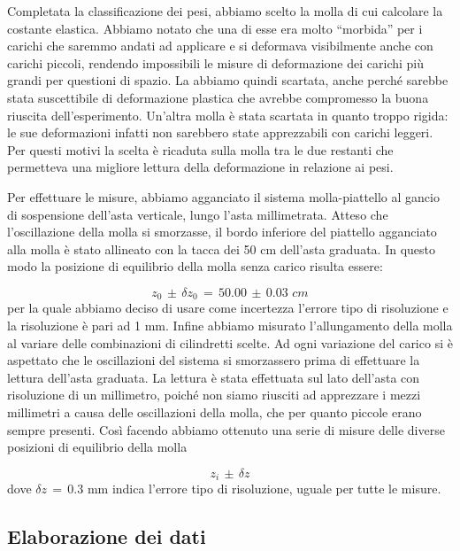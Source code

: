 Completata la classificazione dei pesi, abbiamo scelto la molla di cui calcolare la
costante elastica. Abbiamo notato che una di esse era molto ``morbida'' per i carichi che saremmo
andati ad applicare e si deformava visibilmente anche con carichi piccoli, rendendo impossibili
le misure di deformazione dei carichi più grandi per questioni di spazio.
La abbiamo quindi scartata, anche perché sarebbe stata suscettibile di deformazione
plastica che avrebbe compromesso la buona riuscita dell'esperimento.
Un'altra molla è stata scartata in quanto troppo rigida: le sue deformazioni infatti non sarebbero state apprezzabili con carichi leggeri. Per questi motivi la scelta è ricaduta sulla molla tra 
le due restanti che permetteva una migliore lettura della deformazione in relazione ai pesi.

Per effettuare le misure, abbiamo agganciato il sistema molla-piattello al gancio di sospensione dell'asta verticale, lungo l'asta millimetrata. Atteso che l'oscillazione della molla si smorzasse, il bordo inferiore del piattello agganciato alla molla è stato allineato con la tacca dei 50 cm dell'asta graduata. In questo modo la posizione di equilibrio della molla senza carico risulta essere:

\begin{equation*}
	z_0\,\pm\,\delta z_0 \,=\, 50.00\,\pm\,0.03 \,\, cm
\end{equation*}
%
per la quale abbiamo deciso di usare come incertezza l'errore tipo di risoluzione e la risoluzione è pari ad 1 mm.
Infine abbiamo misurato l'allungamento della molla al variare delle combinazioni di cilindretti scelte. Ad ogni variazione del carico si è aspettato che le oscillazioni del sistema si smorzassero prima di effettuare la lettura dell'asta graduata. La lettura è stata effettuata sul lato dell'asta con risoluzione di un millimetro, poiché non siamo riusciti ad apprezzare i mezzi millimetri a causa delle oscillazioni della molla, che per quanto piccole erano sempre presenti. Così facendo abbiamo ottenuto una serie di misure delle diverse posizioni di equilibrio della molla

\begin{equation*}
	z_i\,\pm\,\delta z
\end{equation*}
%
dove $\delta z \,=\, 0.3$ mm indica l'errore tipo di risoluzione, uguale per tutte le misure.

\subsection{Elaborazione dei dati}

